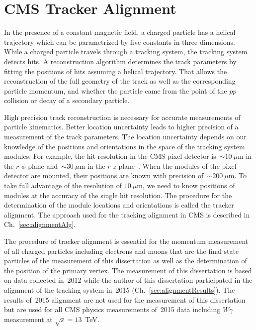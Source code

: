 \chapter{CMS Tracker Alignment} %
\label{sec:alignment}

In the presence of a constant magnetic field, a charged particle has a helical trajectory which can be parametrized by five constants in three dimensions. While a charged particle travels through a tracking system, the tracking system detects hits. A reconstruction algorithm determines the track parameters by fitting the positions of hits assuming a helical trajectory. That allows the reconstruction of the full geometry of the track as well as the corresponding particle momentum, and whether the particle came from the point of the $pp$ collision or decay of a secondary particle.

High precision track reconstruction is necessary for accurate measurements of particle kinematics. Better location uncertainty leads to higher precision of a measurement of the track parameters. The location uncertainty depends on our knowledge of the positions and orientations in the space of the tracking system modules. For example, the hit resolution in the CMS pixel detector is~$\sim10~\mu$m in the $r$-$\phi$ plane and~$\sim30~\mu$m in the $r$-$z$ plane~\cite{ref_trackerPerformance}. When the modules of the pixel detector are mounted, their positions are known with precision of~$\sim200~\mu$m. To take full advantage of the resolution of $10~\mu$m, we need to know positions of modules at the accuracy of the single hit resolution. The procedure for the determination of the module locations and orientations is called the tracker alignment. The approach used for the tracking alignment in CMS is described in Ch.~\ref{sec:alignmentAlg}.

The procedure of tracker alignment is essential for the momentum measurement of all charged particles including electrons and muons that are the final state particles of the measurement of this dissertation as well as the determination of the position of the primary vertex. The measurement of this dissertation is based on data collected in~2012 while the author of this dissertation participated in the alignment of the tracking system in~2015 (Ch.~\ref{sec:alignmentResults}). The results of~2015 alignment are not used for the measurement of this dissertation but are used for all CMS physics measurements of~2015 data including $W\gamma$ measurement at $\sqrt{s}=13$~TeV. 

